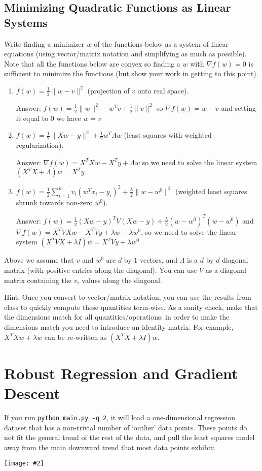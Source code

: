 \documentclass{article}
\def\ans#1{\par\gre{Answer: #1}}
\def\blu#1{{\color{blu}#1}}
\def\gre#1{{\color{gre}#1}}
\def\norm#1{\|#1\|}
\def\half{\frac 1 2}
\newcommand{\centerfig}[2]{\begin{center}\texttt{[image: \#2]}\end{center}}
\def\enum#1{\begin{enumerate}#1\end{enumerate}}
\begin{document}
\subsection{Minimizing Quadratic Functions as Linear Systems}


Write finding a minimizer $w$ of the functions below as a system of linear equations (using vector/matrix notation and simplifying as much as possible). Note that all the functions below are convex so finding a $w$ with $\nabla f(w) = 0$ is sufficient to minimize the functions (but show your work in getting to this point).

\blu{\enum{
\item $f(w) = \frac{1}{2}\norm{w-v}^2$ (projection of $v$ onto real space).
\ans{$f(w) = \frac{1}{2}\norm{w}^2 - w^Tv + \half \norm{v}^2$ so $\nabla f(w) = w - v$ and setting it equal to 0 we have $w=v$}
\item $f(w)= \frac{1}{2}\norm{Xw - y}^2 + \frac{1}{2}w^T\Lambda w$ (least squares with weighted regularization).
\ans{$\nabla f(w) = X^TXw - X^Ty + \Lambda w$ so  we need to solve the linear system $(X^TX + \Lambda)w = X^Ty$}
\item $f(w) = \frac{1}{2}\sum_{i=1}^n v_i (w^Tx_i - y_i)^2 + \frac{\lambda}{2}\norm{w-w^0}^2$ (weighted least squares shrunk towards non-zero $w^0$).
\ans{$f(w) = \half (Xw - y)^TV(Xw - y) + \frac{\lambda}{2}(w-w^0)^T(w-w^0)$  and $\nabla f(w) = X^TVXw - X^TVy + \lambda w - \lambda w^0$, so we need to solve the linear system $(X^TVX + \lambda I)w = X^TVy + \lambda w^0$}
}}
Above we assume that $v$ and $w^0$ are $d$ by $1$ vectors, and $\Lambda$ is a $d$ by $d$ diagonal matrix (with positive entries along the diagonal). You can use $V$ as a diagonal matrix containing the $v_i$ values along the diagonal.

Hint: Once you convert to vector/matrix notation, you can use the results from class to quickly compute these quantities term-wise.
As a sanity check, make that the dimensions match for all quantities/operations: in order to make the dimensions match you need to introduce an identity matrix. For example, $X^TXw + \lambda w$ can be re-written as $(X^TX + \lambda I)w$.



\section{Robust Regression and Gradient Descent}

If you run \verb|python main.py -q 2|, it will load a one-dimensional regression
dataset that has a non-trivial number of `outlier' data points.
These points do not fit the general trend of the rest of the data,
and pull the least squares model away from the main downward trend that most data points exhibit:
\centerfig{.7}{../figs/least_squares_outliers.pdf}
\end{document}
